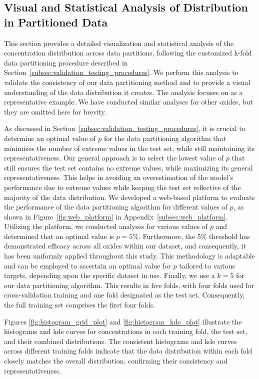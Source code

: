 \subsection{Visual and Statistical Analysis of  Distribution in Partitioned Data}\label{sec:visual_analysis}
This section provides a detailed visualization and statistical analysis of the  concentration distribution across data partitions, following the customized k-fold data partitioning procedure described in Section~\ref{subsec:validation_testing_procedures}.
We perform this analysis to validate the consistency of our data partitioning method and to provide a visual understanding of the data distribution it creates.
The analysis focuses on  as a representative example.
We have conducted similar analyses for other oxides, but they are omitted here for brevity.

As discussed in Section~\ref{subsec:validation_testing_procedures}, it is crucial to determine an optimal value of $p$ for the data partitioning algorithm that minimizes the number of extreme values in the test set, while still maintaining its representativeness.
Our general approach is to select the lowest value of $p$ that still ensures the test set contains no extreme values, while maximizing its general representativeness.
This helps in avoiding an overestimation of the model's performance due to extreme values while keeping the test set reflective of the majority of the data distribution.
We developed a web-based platform to evaluate the performance of the data partitioning algorithm for different values of $p$, as shown in Figure~\ref{fig:web_platform} in Appendix~\ref{subsec:web_platform}.
Utilizing the platform, we conducted analyses for various values of $p$ and determined that an optimal value is $p=5\%$.
Furthermore, the 5\% threshold has demonstrated efficacy across all oxides within our dataset, and consequently, it has been uniformly applied throughout this study.
This methodology is adaptable and can be employed to ascertain an optimal value for $p$ tailored to various targets, depending upon the specific dataset in use.
Finally, we use a $k=5$ for our data partitioning algorithm.
This results in five folds, with four folds used for cross-validation training and one fold designated as the test set.
Consequently, the full training set comprises the first four folds.

Figures \ref{fig:histogram_grid_plot} and \ref{fig:histogram_kde_plot} illustrate the histograms and \gls{kde} curves for  concentrations in each training fold, the test set, and their combined distributions.
The consistent histograms and \gls{kde} curves across different training folds indicate that the data distribution within each fold closely matches the overall distribution, confirming their consistency and representativeness.


